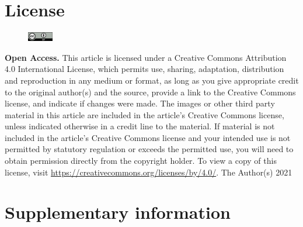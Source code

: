 \documentclass[twocolumn, serif, empirical, authordate, seplic]{jote-article}
\begin{document}
    \section*{License}
        \begin{figure}%
        \vspace{-12pt}
        \includegraphics[width=0.1\textwidth]{media/by}%
        \end{figure}
        \textbf{\textsf{Open Access.}} This article is licensed under a Creative Commons Attribution 4.0 International License, which permits use, sharing, adaptation, distribution and reproduction in any medium or format, as long as you give appropriate credit to the original author(s) and the source, provide a link to the Creative Commons license, and indicate if changes were made. The images or other third party material in this article are included in the article’s Creative Commons license, unless indicated otherwise in a credit line to the material. If material is not included in the article’s Creative Commons license and your intended use is not permitted by statutory regulation or exceeds the permitted use, you will need to obtain permission directly from the copyright holder. To view a copy of this license, visit \href{https://creativecommons.org/licenses/by/4.0/}{https://creativecommons.org/licenses/by/4.0/}.
        \newline\newline
        \textcopyright \text{ }The Author(s) 2021

\onecolumn

 {}\section*{Supplementary information} 
\end{document}

